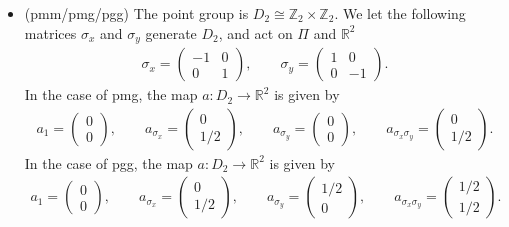 \documentclass[pdftex]{sigma}
\theoremstyle{definition}
\newcommand{\R}{\mathbb{R}}
\newcommand{\Z}{\mathbb{Z}}
\begin{document}
\begin{itemize}
\item
(\textsf{pmm/pmg/pgg})
The point group is $D_2 \cong \Z_2 \times \Z_2$. We let the following matrices $\sigma_x$ and $\sigma_y$ generate $D_2$, and act on $\Pi$ and $\R^2$
\begin{gather*}
\sigma_x =
\left(
\begin{matrix}
-1 & 0\\
0 & 1
\end{matrix}
\right), \qquad
\sigma_y =
\left(
\begin{matrix}
1 & 0\\
0 & -1
\end{matrix}
\right).
\end{gather*}
In the case of \textsf{pmg}, the map $a\colon D_2 \to \R^2$ is given by
\begin{gather*}
a_1 =
\left(
\begin{matrix}
0 \\ 0
\end{matrix}
\right),\qquad
a_{\sigma_x} =
\left(
\begin{matrix}
0 \\ 1/2
\end{matrix}
\right),
\qquad
a_{\sigma_y} =
\left(
\begin{matrix}
0 \\ 0
\end{matrix}
\right),
\qquad
a_{\sigma_x\sigma_y} =
\left(
\begin{matrix}
0 \\ 1/2
\end{matrix}
\right).
\end{gather*}
In the case of \textsf{pgg}, the map $a \colon D_2 \to \R^2$ is given by
\begin{gather*}
a_1 =
\left(
\begin{matrix}
0 \\ 0
\end{matrix}
\right),
\qquad
a_{\sigma_x} =
\left(
\begin{matrix}
0 \\ 1/2
\end{matrix}
\right),
\qquad
a_{\sigma_y} =
\left(
\begin{matrix}
1/2 \\ 0
\end{matrix}
\right),
\qquad
a_{\sigma_x\sigma_y} =
\left(
\begin{matrix}
1/2 \\ 1/2
\end{matrix}
\right).
\end{gather*}


\end{itemize}
\end{document}

